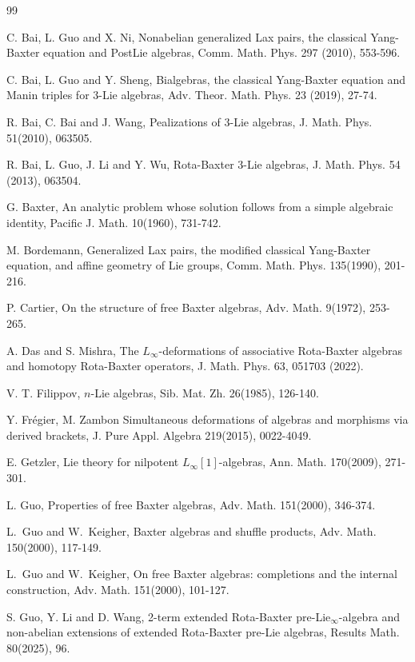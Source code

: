 \documentclass[12pt]{amsart}
\theoremstyle{definition}
\begin{document}
\begin{thebibliography}{99}


 C. Bai, L. Guo and X. Ni, Nonabelian generalized Lax pairs, the classical Yang-Baxter equation and
PostLie algebras, Comm. Math. Phys.  297 (2010), 553-596.

 C. Bai, L. Guo and Y. Sheng, Bialgebras, the classical Yang-Baxter equation and Manin triples for $3$-Lie algebras, Adv. Theor. Math. Phys.  23 (2019), 27-74.

   R. Bai, C. Bai and J. Wang, Pealizations of $3$-Lie algebras, J. Math. Phys. 51(2010), 063505.

 R. Bai, L. Guo, J. Li and Y. Wu,   Rota-Baxter $3$-Lie algebras, J. Math. Phys. 54 (2013),  063504.

 G. Baxter, An analytic problem whose solution follows from a simple algebraic identity,   Pacific J. Math. 10(1960), 731-742.

  M. Bordemann, Generalized Lax pairs, the modified classical Yang-Baxter equation, and affine geometry of Lie groups, Comm. Math. Phys. 135(1990), 201-216.

 P. Cartier, On the structure of free Baxter algebras, Adv. Math.  9(1972),  253-265.


 A. Das and S. Mishra, The
$L_\infty$-deformations of associative Rota-Baxter algebras and homotopy Rota-Baxter operators, J. Math. Phys. 63, 051703 (2022).


 V. T. Filippov, $n$-Lie algebras,  Sib. Mat. Zh. 26(1985),  126-140.


 Y. Fr\'{e}gier, M. Zambon Simultaneous deformations of algebras and morphisms via derived brackets, J. Pure Appl. Algebra 219(2015), 0022-4049.

  E. Getzler, Lie theory for nilpotent $L_\infty[1]$-algebras, Ann. Math.  170(2009),  271-301.

  L. Guo, Properties of free Baxter algebras,  Adv. Math.  151(2000), 346-374.

 L.~Guo and W.~Keigher, Baxter algebras and shuffle products,  Adv. Math.
150(2000), 117-149.

  L.~Guo and W.~Keigher, On free Baxter algebras: completions and the
internal construction, Adv. Math. 151(2000), 101-127.



 S. Guo, Y. Li and D. Wang,  2-term extended  Rota-Baxter pre-Lie$_{\infty}$-algebra and non-abelian extensions of extended Rota-Baxter pre-Lie algebras,  Results Math.  80(2025),  96.


\end{thebibliography}
\end{document}
